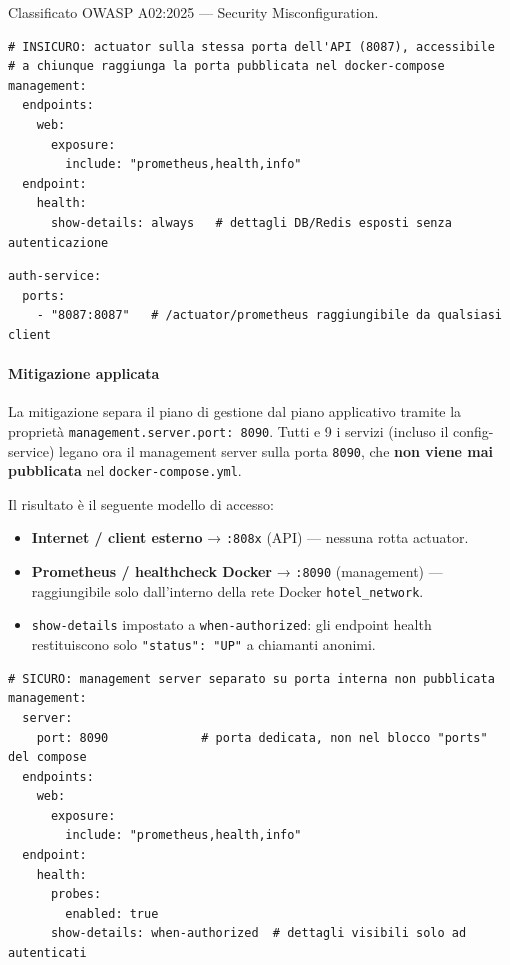 ﻿\documentclass[a4paper,12pt]{report}
\begin{document}
Classificato OWASP A02:2025 --- Security Misconfiguration.

\begin{insecurebox}[title={Configurazione Vulnerabile --- auth-service.yml (baseline)}]
\begin{lstlisting}[style=yaml]
# INSICURO: actuator sulla stessa porta dell'API (8087), accessibile
# a chiunque raggiunga la porta pubblicata nel docker-compose
management:
  endpoints:
    web:
      exposure:
        include: "prometheus,health,info"
  endpoint:
    health:
      show-details: always   # dettagli DB/Redis esposti senza autenticazione
\end{lstlisting}
\end{insecurebox}

\begin{insecurebox}[title={docker-compose.yml (baseline) --- porta applicativa pubblicata}]
\begin{lstlisting}[style=yaml]
auth-service:
  ports:
    - "8087:8087"   # /actuator/prometheus raggiungibile da qualsiasi client
\end{lstlisting}
\end{insecurebox}

\paragraph{Mitigazione applicata}
La mitigazione separa il piano di gestione dal piano applicativo tramite la proprietà
\texttt{management.server.port: 8090}. Tutti e 9 i servizi (incluso il config-service)
legano ora il management server sulla porta \texttt{8090}, che \textbf{non viene mai
pubblicata} nel \texttt{docker-compose.yml}.

Il risultato è il seguente modello di accesso:

\begin{itemize}
  \item \textbf{Internet / client esterno} → \texttt{:808x} (API) — nessuna rotta actuator.
  \item \textbf{Prometheus / healthcheck Docker} → \texttt{:8090} (management) — raggiungibile
        solo dall'interno della rete Docker \texttt{hotel\_network}.
  \item \texttt{show-details} impostato a \texttt{when-authorized}: gli endpoint health
        restituiscono solo \texttt{"status": "UP"} a chiamanti anonimi.
\end{itemize}

\begin{securebox}[title={Configurazione Sicura --- auth-service.yml (feature/secure-coding-hardening)}]
\begin{lstlisting}[style=yaml]
# SICURO: management server separato su porta interna non pubblicata
management:
  server:
    port: 8090             # porta dedicata, non nel blocco "ports" del compose
  endpoints:
    web:
      exposure:
        include: "prometheus,health,info"
  endpoint:
    health:
      probes:
        enabled: true
      show-details: when-authorized  # dettagli visibili solo ad autenticati
\end{lstlisting}
\end{securebox}
\end{document}
